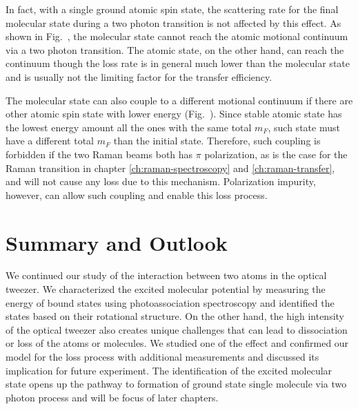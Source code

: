 In fact, with a single ground atomic spin state, the scattering rate for the final molecular
state during a two photon transition is not affected by this effect.
As shown in Fig.~\todo{\ref{}}, the molecular state cannot reach the atomic motional continuum
via a two photon transition.
The atomic state, on the other hand, can reach the continuum though the loss rate is in general
much lower than the molecular state
and is usually not the limiting factor for the transfer efficiency.

The molecular state can also couple to a different motional continuum if there are other
atomic spin state with lower energy (Fig.~\todo{\ref{}}).
Since stable atomic state has the lowest energy amount all the ones with the same total $m_F$,
such state must have a different total $m_F$ than the initial state.
Therefore, such coupling is forbidden if the two Raman beams both has $\pi$ polarization,
as is the case for the Raman transition in chapter \ref{ch:raman-spectroscopy}
and \ref{ch:raman-transfer}, and will not cause any loss due to this mechanism.
Polarization impurity, however, can allow such coupling and enable this loss process.

\section{Summary and Outlook}
We continued our study of the interaction between two atoms in the optical tweezer.
We characterized the excited molecular potential by measuring
the energy of bound states using photoassociation spectroscopy
and identified the states based on their rotational structure.
On the other hand, the high intensity of the optical tweezer
also creates unique challenges that can lead to dissociation or loss of the atoms or molecules.
We studied one of the effect and confirmed our model for the loss process with
additional measurements and discussed its implication for future experiment.
The identification of the excited molecular state opens up the pathway
to formation of ground state single molecule via two photon process
and will be focus of later chapters.
